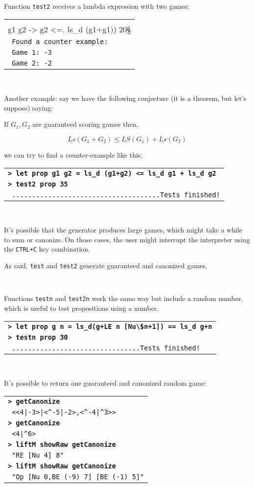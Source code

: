 \documentclass[a4paper,12pt]{article}
\newcommand{\bash}[1]{\small\textbf{\lstinline§> #1§}\\}
\newcommand{\out}[1]{\small\lstinline§ #1§}
\newcommand{\haskellCode}{\fontfamily{pcr}\selectfont}
\newenvironment{sgcode}
	{ \haskellCode
	  \begin{tabular}{|p{0.9\textwidth}|}
      \hline	
	}
	{ \\\hline  
      \end{tabular} \\
	  \par 
	}
\begin{document}
Function \verb|test2| receives a lambda expression with two games:

\begin{sgcode}
\bash{test2 (\\g1 g2 -> g2 <=. ls_d (g1+g1)) 20}
\out{Found a counter example:} \\
\out{Game 1: -3} \\
\out{Game 2: -2} 
\end{sgcode}

Another example: say we have the following conjecture (it is a theorem, but let's suppose) saying:

If $G_1, G_2$ are guaranteed scoring games then,

$$\underline{Ls}(G_1+G_2) \leq \underline{LS}(G_1) + \underline{Ls}(G_2)$$

we can try to find a counter-example like this:

\begin{sgcode}
\bash{let prop g1 g2 = ls_d (g1+g2) <= ls_d g1 + ls_d g2}
\bash{test2 prop 35}
\out{.....................................Tests finished!} 
\end{sgcode}

It's possible that the generator produces large games, which might take
a while to sum or canonize. On those cases, the user might interrupt the interpreter
using the \verb|CTRL+C| key combination.

As said, \verb|test| and \verb|test2| generate guaranteed and canonized games.

~

Functions \verb|testn| and \verb|test2n| work the same way but include a random number, which
is useful to test propositions using a number.

\begin{sgcode}
\bash{let prop g n = ls_d(g+LE n [Nu\$n+1]) == ls_d g+n}
\bash{testn prop 30}
\out{................................Tests finished!} 
\end{sgcode}

It's possible to return one guaranteed and canonized random game:

\begin{sgcode}
\bash{getCanonize}
\out{<<4|-3>|<^-5|-2>,<^-4|^3>>} \\
\bash{getCanonize}
\out{<4|^6>} \\
\bash{liftM showRaw getCanonize}
\out{"RE [Nu 4] 8"} \\
\bash{liftM showRaw getCanonize}
\out{"Op [Nu 0,BE (-9) 7] [BE (-1) 5]"}
\end{sgcode}
\end{document}
